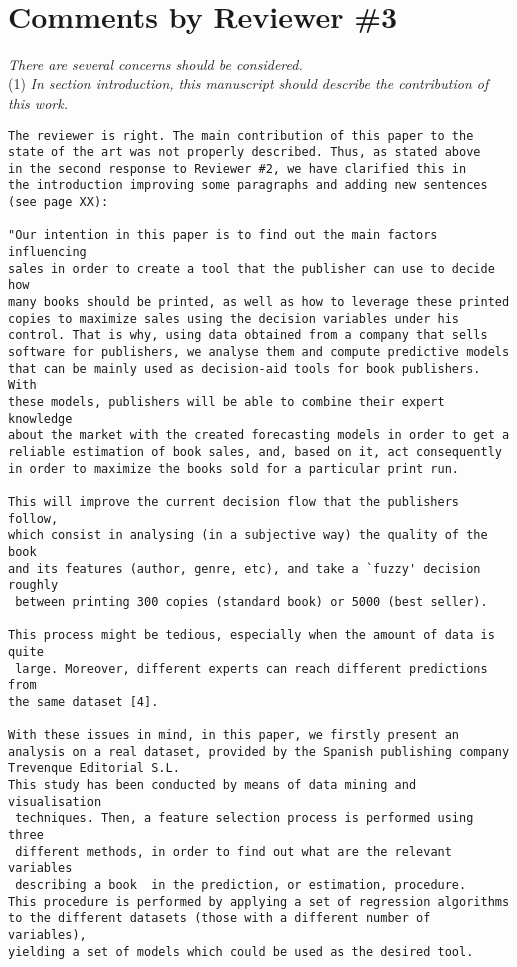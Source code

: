 \documentclass[preprint]{elsarticle}
\begin{document}
~\\


\section{Comments by Reviewer \#3}

\noindent \emph{There are several concerns should be considered.}\\

\noindent (1) \emph{In section introduction, this manuscript should describe the contribution of this work. } 

\begin{verbatim}
The reviewer is right. The main contribution of this paper to the 
state of the art was not properly described. Thus, as stated above 
in the second response to Reviewer #2, we have clarified this in 
the introduction improving some paragraphs and adding new sentences 
(see page XX):

"Our intention in this paper is to find out the main factors influencing
sales in order to create a tool that the publisher can use to decide how 
many books should be printed, as well as how to leverage these printed
copies to maximize sales using the decision variables under his
control. That is why, using data obtained from a company that sells
software for publishers, we analyse them and compute predictive models 
that can be mainly used as decision-aid tools for book publishers. With 
these models, publishers will be able to combine their expert knowledge 
about the market with the created forecasting models in order to get a 
reliable estimation of book sales, and, based on it, act consequently 
in order to maximize the books sold for a particular print run. 

This will improve the current decision flow that the publishers follow, 
which consist in analysing (in a subjective way) the quality of the book 
and its features (author, genre, etc), and take a `fuzzy' decision roughly
 between printing 300 copies (standard book) or 5000 (best seller).

This process might be tedious, especially when the amount of data is quite
 large. Moreover, different experts can reach different predictions from 
the same dataset [4].

With these issues in mind, in this paper, we firstly present an 
analysis on a real dataset, provided by the Spanish publishing company 
Trevenque Editorial S.L.
This study has been conducted by means of data mining and visualisation
 techniques. Then, a feature selection process is performed using three
 different methods, in order to find out what are the relevant variables
 describing a book  in the prediction, or estimation, procedure. 
This procedure is performed by applying a set of regression algorithms 
to the different datasets (those with a different number of variables), 
yielding a set of models which could be used as the desired tool. 


\end{verbatim}
\end{document}
